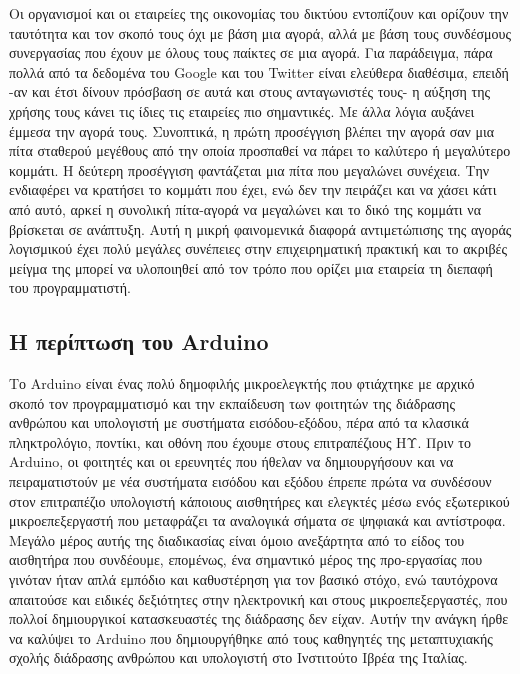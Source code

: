 \documentclass[
]{article}
\begin{document}
Οι οργανισμοί και οι εταιρείες της οικονομίας του δικτύου εντοπίζουν και
ορίζουν την ταυτότητα και τον σκοπό τους όχι με βάση μια αγορά, αλλά με
βάση τους συνδέσμους συνεργασίας που έχουν με όλους τους παίκτες σε μια
αγορά. Για παράδειγμα, πάρα πολλά από τα δεδομένα του Google και του
Twitter είναι ελεύθερα διαθέσιμα, επειδή -αν και έτσι δίνουν πρόσβαση σε
αυτά και στους ανταγωνιστές τους- η αύξηση της χρήσης τους κάνει τις
ίδιες τις εταιρείες πιο σημαντικές. Με άλλα λόγια αυξάνει έμμεσα την
αγορά τους. Συνοπτικά, η πρώτη προσέγγιση βλέπει την αγορά σαν μια πίτα
σταθερού μεγέθους από την οποία προσπαθεί να πάρει το καλύτερο ή
μεγαλύτερο κομμάτι. Η δεύτερη προσέγγιση φαντάζεται μια πίτα που
μεγαλώνει συνέχεια. Την ενδιαφέρει να κρατήσει το κομμάτι που έχει, ενώ
δεν την πειράζει και να χάσει κάτι από αυτό, αρκεί η συνολική πίτα-αγορά
να μεγαλώνει και το δικό της κομμάτι να βρίσκεται σε ανάπτυξη. Αυτή η
μικρή φαινομενικά διαφορά αντιμετώπισης της αγοράς λογισμικού έχει πολύ
μεγάλες συνέπειες στην επιχειρηματική πρακτική και το ακριβές μείγμα της
μπορεί να υλοποιηθεί από τον τρόπο που ορίζει μια εταιρεία τη διεπαφή
του προγραμματιστή.

\hypertarget{ux3b7-ux3c0ux3b5ux3c1ux3afux3c0ux3c4ux3c9ux3c3ux3b7-ux3c4ux3bfux3c5-arduino}{%
\subsection{Η περίπτωση του
Arduino}\label{ux3b7-ux3c0ux3b5ux3c1ux3afux3c0ux3c4ux3c9ux3c3ux3b7-ux3c4ux3bfux3c5-arduino}}

Το Arduino είναι ένας πολύ δημοφιλής μικροελεγκτής που φτιάχτηκε με
αρχικό σκοπό τον προγραμματισμό και την εκπαίδευση των φοιτητών της
διάδρασης ανθρώπου και υπολογιστή με συστήματα εισόδου-εξόδου, πέρα από
τα κλασικά πληκτρολόγιο, ποντίκι, και οθόνη που έχουμε στους
επιτραπέζιους ΗΥ. Πριν το Arduino, οι φοιτητές και οι ερευνητές που
ήθελαν να δημιουργήσουν και να πειραματιστούν με νέα συστήματα εισόδου
και εξόδου έπρεπε πρώτα να συνδέσουν στον επιτραπέζιο υπολογιστή
κάποιους αισθητήρες και ελεγκτές μέσω ενός εξωτερικού μικροεπεξεργαστή
που μεταφράζει τα αναλογικά σήματα σε ψηφιακά και αντίστροφα. Μεγάλο
μέρος αυτής της διαδικασίας είναι όμοιο ανεξάρτητα από το είδος του
αισθητήρα που συνδέουμε, επομένως, ένα σημαντικό μέρος της προ-εργασίας
που γινόταν ήταν απλά εμπόδιο και καθυστέρηση για τον βασικό στόχο, ενώ
ταυτόχρονα απαιτούσε και ειδικές δεξιότητες στην ηλεκτρονική και στους
μικροεπεξεργαστές, που πολλοί δημιουργικοί κατασκευαστές της διάδρασης
δεν είχαν. Αυτήν την ανάγκη ήρθε να καλύψει το Arduino που δημιουργήθηκε
από τους καθηγητές της μεταπτυχιακής σχολής διάδρασης ανθρώπου και
υπολογιστή στο Ινστιτούτο Ιβρέα της Ιταλίας.
\end{document}

